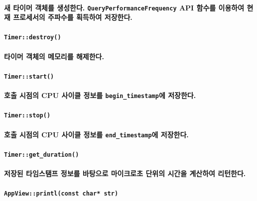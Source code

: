 \documentclass[UTF8]{report}
\begin{document}
            \paragraph{%
                \normalfont 새 타이머 객체를 생성한다. \texttt{QueryPerformanceFrequency} API 함수를 이용하여 현재 프로세서의 주파수를 획득하여 저장한다.
            }

            \paragraph{\texttt{Timer::destroy()}}
            \paragraph{%
                \normalfont 타이머 객체의 메모리를 해제한다.
            }

            \paragraph{\texttt{Timer::start()}}
            \paragraph{%
                \normalfont 호출 시점의 CPU 사이클 정보를 \texttt{begin\_timestamp}에 저장한다.
            }

            \paragraph{\texttt{Timer::stop()}}
            \paragraph{%
                \normalfont 호출 시점의 CPU 사이클 정보를 \texttt{end\_timestamp}에 저장한다.
            }

            \paragraph{\texttt{Timer::get\_duration()}}
            \paragraph{%
                \normalfont 저장된 타임스탬프 정보를 바탕으로 마이크로초 단위의 시간을 계산하여 리턴한다.
            }

            \paragraph{\texttt{AppView::printl(const char* str)}}
\end{document}
